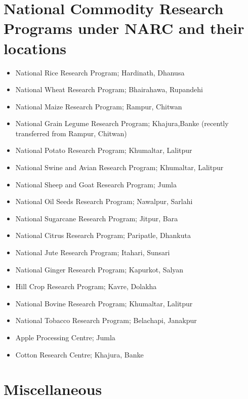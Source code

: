 \documentclass[
  openany]{book}
\providecommand{\tightlist}{%
  \setlength{\itemsep}{0pt}\setlength{\parskip}{0pt}}
\begin{document}
\hypertarget{national-commodity-research-programs-under-narc-and-their-locations}{%
\section{National Commodity Research Programs under NARC and their locations}\label{national-commodity-research-programs-under-narc-and-their-locations}}

\begin{itemize}
\tightlist
\item
  National Rice Research Program; Hardinath, Dhanusa
\item
  National Wheat Research Program; Bhairahawa, Rupandehi
\item
  National Maize Research Program; Rampur, Chitwan
\item
  National Grain Legume Research Program; Khajura,Banke (recently transferred from Rampur, Chitwan)
\item
  National Potato Research Program; Khumaltar, Lalitpur
\item
  National Swine and Avian Research Program; Khumaltar, Lalitpur
\item
  National Sheep and Goat Research Program; Jumla
\item
  National Oil Seeds Research Program; Nawalpur, Sarlahi
\item
  National Sugarcane Research Program; Jitpur, Bara
\item
  National Citrus Research Program; Paripatle, Dhankuta
\item
  National Jute Research Program; Itahari, Sunsari
\item
  National Ginger Research Program; Kapurkot, Salyan
\item
  Hill Crop Research Program; Kavre, Dolakha
\item
  National Bovine Research Program; Khumaltar, Lalitpur
\item
  National Tobacco Research Program; Belachapi, Janakpur
\item
  Apple Processing Centre; Jumla
\item
  Cotton Research Centre; Khajura, Banke
\end{itemize}

\hypertarget{miscellaneous}{%
\section{Miscellaneous}\label{miscellaneous}}
\end{document}
